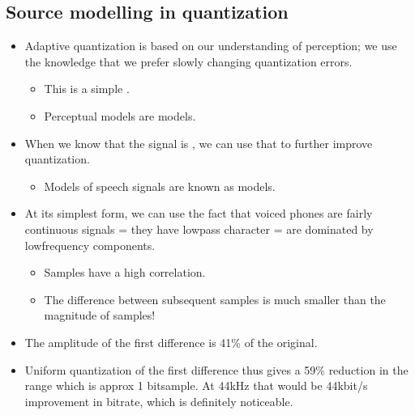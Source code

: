 \documentclass[letterpaper,10pt,english]{jupyterBook}
\begin{document}
\subsection{Source modelling in quantization}
\label{\detokenize{Representations/Waveform:source-modelling-in-quantization}}\begin{itemize}
\item {} 
\sphinxAtStartPar
Adaptive quantization is based on our understanding of perception;
we use the knowledge that we prefer slowly changing quantization
errors.
\begin{itemize}
\item {} 
\sphinxAtStartPar
This is a simple .

\item {} 
\sphinxAtStartPar
Perceptual models are  models.

\end{itemize}

\item {} 
\sphinxAtStartPar
When we know that the signal is , we can use that to further
improve quantization.
\begin{itemize}
\item {} 
\sphinxAtStartPar
Models of speech signals are known as  models.

\end{itemize}

\item {} 
\sphinxAtStartPar
At its simplest form, we can use the fact that voiced phones are
fairly continuous signals = they have low\sphinxhyphen{}pass character = are
dominated by low\sphinxhyphen{}frequency components.
\begin{itemize}
\item {} 
\sphinxAtStartPar
Samples have a high correlation.

\item {} 
\sphinxAtStartPar
The difference between subsequent samples is much smaller than
the magnitude of samples!

\end{itemize}

\item {} 
\sphinxAtStartPar
The amplitude of the first difference is 41\% of the original.

\item {} 
\sphinxAtStartPar
Uniform quantization of the first difference thus gives a 59\%
reduction in the range which is approx 1 bitsample. At 44kHz that
would be 44kbit/s improvement in bitrate, which is definitely
noticeable.

\end{itemize}
\end{document}
